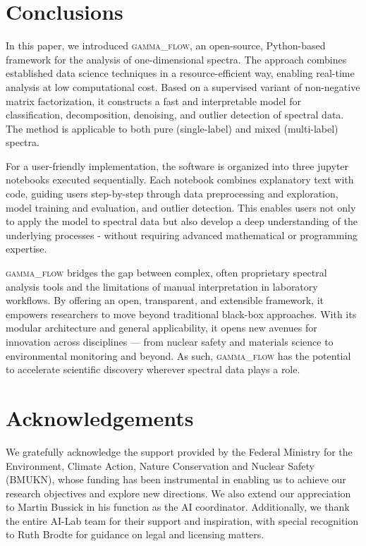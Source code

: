 \documentclass[review, 12pt, a4paper]{elsarticle}
\begin{document}
\section{Conclusions}
In this paper, we introduced \textsc{gamma\_flow}, an open-source, Python-based framework for the analysis of one-dimensional spectra. The approach combines established data science techniques in a resource-efficient way, enabling real-time analysis at low computational cost. Based on a supervised variant of non-negative matrix factorization, it constructs a fast and interpretable model for classification, decomposition, denoising, and outlier detection of spectral data. The method is applicable to both pure (single-label) and mixed (multi-label) spectra. 

For a user-friendly implementation, the software is organized into three jupyter notebooks executed sequentially. Each notebook combines explanatory text with code, guiding users step-by-step through data preprocessing and exploration, model training and evaluation, and outlier detection. This enables users not only to apply the model to spectral data but also develop a deep understanding of the underlying processes - without requiring advanced mathematical or programming expertise.  

\textsc{gamma\_flow} bridges the gap between complex, often proprietary spectral analysis tools and the limitations of manual interpretation in laboratory workflows. By offering an open, transparent, and extensible framework, it empowers researchers to move beyond traditional black-box approaches. With its modular architecture and general applicability, it opens new avenues for innovation across disciplines — from nuclear safety and materials science to environmental monitoring and beyond. As such, \textsc{gamma\_flow} has the potential to accelerate scientific discovery wherever spectral data plays a role.

\section*{Acknowledgements}
We gratefully acknowledge the support provided by the Federal Ministry for the Environment, Climate Action, Nature Conservation and Nuclear Safety (BMUKN), whose funding has been instrumental in enabling us to achieve our research objectives and explore new directions. 
We also extend our appreciation to Martin Bussick in his function as the AI coordinator. 
Additionally, we thank the entire AI-Lab team for their support and inspiration, with special recognition to Ruth Brodte for guidance on legal and licensing matters.

 

\end{document}
